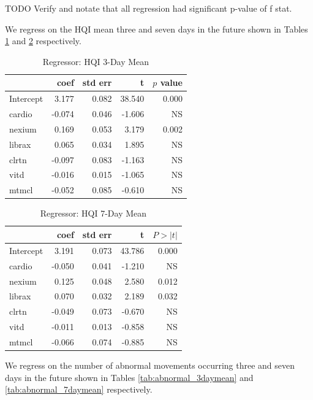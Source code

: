 \documentclass[conference]{IEEEtran}
\begin{document}
TODO Verify and notate that all regression had significant p-value of f stat.

We regress on the HQI mean three and seven days in the future shown in Tables \ref{tab:hqi_3daymean} and \ref{tab:hqi_7daymean} respectively.

\begin{table}
\begin{center}
\caption {Regressor: HQI 3-Day Mean} \label{tab:hqi_3daymean} 
    \begin{tabular}{ | l | r | r | r | r |}
    \hline
     & coef & std err & t & $p$ value \\ \hline
Intercept & 3.177 & 0.082 & 38.540 & 0.000 \\
cardio & -0.074 & 0.046 & -1.606 & NS \\
nexium & 0.169 & 0.053 & 3.179 & 0.002 \\
librax & 0.065 & 0.034 & 1.895 & NS \\
clrtn & -0.097 & 0.083 & -1.163 & NS \\
vitd & -0.016 & 0.015 & -1.065 & NS \\
mtmcl & -0.052 & 0.085 & -0.610 & NS \\
    \hline
\end{tabular}
\end{center}
    \end{table}

\begin{table}
\begin{center}
\caption {Regressor: HQI 7-Day Mean} \label{tab:hqi_7daymean}
    \begin{tabular}{ | l | r | r | r | r |}
    \hline
     & coef & std err & t & $P>\left|t\right|$ \\ \hline
Intercept & 3.191 & 0.073 & 43.786 & 0.000 \\
cardio & -0.050 & 0.041 & -1.210 & NS \\
nexium & 0.125 & 0.048 & 2.580 & 0.012 \\
librax & 0.070 & 0.032 & 2.189 & 0.032 \\
clrtn & -0.049 & 0.073 & -0.670 & NS \\
vitd & -0.011 & 0.013 & -0.858 & NS \\
mtmcl & -0.066 & 0.074 & -0.885 & NS \\
    \hline
    \end{tabular}
\end{center}
\end{table}


We regress on the number of abnormal movements occurring three and seven days in the future shown in Tables \ref{tab:abnormal_3daymean} and \ref{tab:abnormal_7daymean} respectively.
\end{document}
